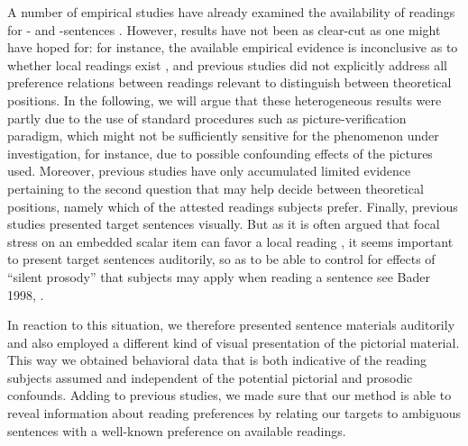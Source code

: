 \documentclass[fleqn,reqno,10pt,draft]{article}
\newcommand{\as}{\acro{as}}
\renewcommand{\es}{\acro{es}}
\begin{document}
A number of empirical studies have already examined the availability
of readings for \as- and \es-sentences
\citep[e.g.][]{GeurtsPouscoulous2009:Embedded-Implic,CliftonDube2010:Embedded-Implic,ChemlaSpector2010:Experimental-Ev}. However,
results have not been as clear-cut as one might have hoped for: for
instance, the available empirical evidence is inconclusive as to
whether local readings exist \citep[see also][for related
discussion]{Tielvan-Tiel2012:Embedded-Scalar}, and previous studies 
did not explicitly address all preference relations between readings relevant to
distinguish between theoretical positions. In the following, we will
argue that these heterogeneous results were partly due to the use of 
standard procedures such as picture-verification paradigm, which might not 
be sufficiently sensitive for the phenomenon under investigation,
for instance, due to possible confounding effects of the pictures used.
Moreover, previous studies have only accumulated limited evidence
pertaining to the second question that may help decide between
theoretical positions, namely which of the attested readings subjects
prefer. Finally, previous studies presented target sentences
visually. But as it is often argued that focal stress on an
embedded scalar item can favor a local reading
\citep[e.g.][]{Horn2006:The-Border-Wars,Geurts2009:Scalar-Implicat,ChemlaSpector2010:Experimental-Ev,Geurts2010:Quantity-Implic,Tielvan-Tiel2012:Embedded-Scalar},
it seems important to present target sentences auditorily, so as to be
able to control for effects of ``silent prosody'' that subjects may
apply when reading a sentence see Bader 1998, \citep{Fodor98}
.

In reaction to this situation, we therefore presented sentence
materials auditorily and also employed a different kind of visual
presentation of the pictorial material.
This way we obtained behavioral data that is both
indicative of the reading subjects assumed and independent of the
potential pictorial and prosodic confounds. 
Adding to previous studies, we made sure that our method is able to
reveal information about reading preferences by relating our targets
to ambiguous sentences with a well-known preference on available
readings.
\end{document}
